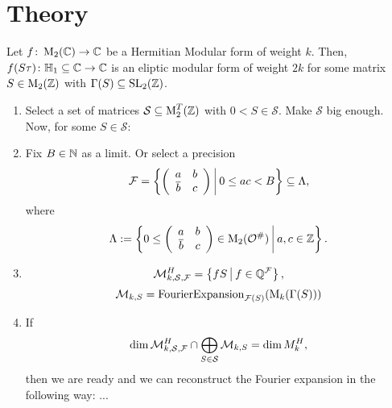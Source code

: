 
\section{Theory}


\begin{lemma}
Let $f \colon \operatorname{M}_2(\mathbb{C}) \rightarrow \mathbb{C}$ be a Hermitian Modular form of weight $k$.
Then, $f(S \tau) \colon \mathbb{H}_1 \subseteq \mathbb{C} \rightarrow \mathbb{C}$ is an eliptic modular form of weight $2k$ for some matrix $S \in \operatorname{M}_2(\mathbb{Z})$ with $\Gamma(S) \subseteq \operatorname{SL}_2(\mathbb{Z})$.
\end{lemma}



\begin{algo}
\begin{enumerate}
\item Select a set of matrices $\mathcal{S} \subseteq \operatorname{M}_2^T(\mathbb{Z})$ with $0 < S \in \mathcal{S}$. Make $\mathcal{S}$ big enough. Now, for some $S \in \mathcal{S}$:

\item Fix $B \in \mathbb{N}$ as a limit. Or select a precision
\[ \F = \Set{\SmallMatrix{a}{b}{\overline b}{c}}{0 \le a c < B} \subseteq \Lambda , \]
where
\[ \Lambda := \Set{0 \le \SmallMatrix{a}{b}{\overline b}{c} \in \M_2(\curlO^\#)}{a,c \in \Z } . \]

\item \[ \mathcal{M}_{k,\mathcal{S},\F}^H = \Set{f S}{f \in \Q^\F} , \]
\[ \mathcal{M}_{k,S} = \textup{\textrm{FourierExpansion}}_{\mathcal{F}(S)}(\operatorname{M}_k(\Gamma(S))) \]

\item If
\[ \dim \mathcal{M}_{k,\mathcal{S},\mathcal{F}}^H \cap \bigoplus_{S \in \mathcal{S}} \mathcal{M}_{k,S}
= \dim M^H_k , \]
then we are ready and we can reconstruct the Fourier expansion in the following way: ...

\end{enumerate}
\end{algo}
